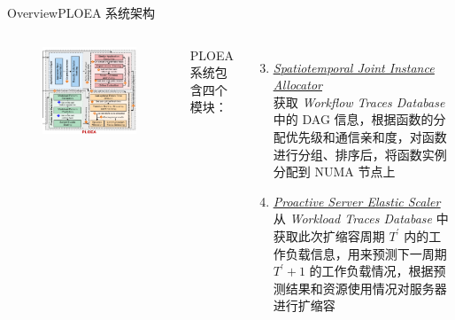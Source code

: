\documentclass[aspectratio=169]{beamer}
\begin{document}
\begin{frame}{Overview}{PLOEA 系统架构}\label{label:architecture-2}
  \begin{columns}
    \begin{figure}
      \centering
      \includegraphics[height=0.75\textheight]{img/method/PLOEA-system-right.pdf}
    \end{figure}

    PLOEA 系统包含四个模块：
    \begin{enumerate}
        \setcounter{enumi}{2}
      \item \hyperlink{label:spatiotemporal-joint-instance-allocator}{\underline{\textit{Spatiotemporal Joint Instance Allocator}}} \\
        获取 \textit{Workflow Traces Database} 中的 DAG 信息，根据函数的分配优先级和通信亲和度，对函数进行分组、排序后，将函数实例分配到 NUMA 节点上
      \item \hyperlink{label:proactive-server-elastic-scaler}{\underline{\textit{Proactive Server Elastic Scaler}}} \\
        从 \textit{Workload Traces Database} 中获取此次扩缩容周期 $T^\prime$ 内的工作负载信息，用来预测下一周期 $T^\prime + 1$ 的工作负载情况，根据预测结果和资源使用情况对服务器进行扩缩容
    \end{enumerate}
  \end{columns}
\end{frame}
\end{document}
